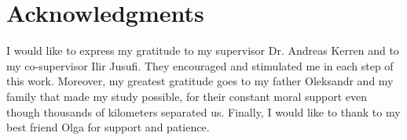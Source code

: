 \section*{Acknowledgments}
\label{sec:acknowledgments}

I would like to express my gratitude to my supervisor Dr. Andreas Kerren and to my co-supervisor Ilir Jusufi.
They encouraged and stimulated me in each step of this work.
Moreover, my greatest gratitude goes to my father Oleksandr and my family that made my study possible,
for their constant moral support even though thousands of kilometers separated us.
Finally, I would like to thank to my best friend Olga for support and patience.